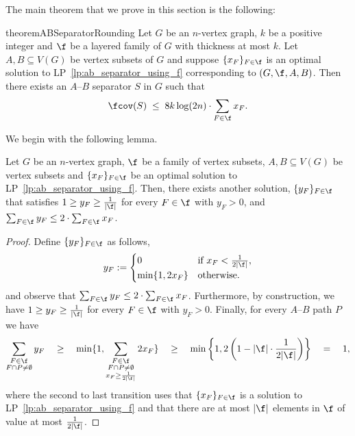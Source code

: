 The main theorem that we prove in this section is the following:

\begin{restatable}{theorem}{ABSeparatorRounding}\label{thm:ab_separator}
    Let $G$ be an $n$-vertex graph, $k$ be a positive integer and $\f$ be a layered family of $G$ with thickness at most $k$. Let $A,B \subseteq V(G)$ be vertex subsets of $G$ and suppose $\{x_F\}_{F \in \f}$ is an optimal solution to LP~\ref{lp:ab_separator_using_f} corresponding to $(G,\f,A,B)$. Then there exists an $A$--$B$ separator $S$ in $G$ such that
    $$
    \fcov(S) \;\le\; 8k  \log(2n) \cdot \sum_{F \in \f} x_F.
    $$
\end{restatable}


We begin with the following lemma.

\begin{lemma}\label{lem:x_F_behaves_nicely}
    Let $G$ be an $n$-vertex graph, $\f$ be a family of vertex subsets, $A, B \subseteq V(G)$ be vertex subsets and $\{x_F\}_{F\in\f}$ be an optimal solution to LP~\ref{lp:ab_separator_using_f}. Then, there exists another solution, $\{y_F\}_{F \in \f}$ that satisfies $1 \geq y_F \geq \frac{1}{|\f|}$ for every $F \in \f$ with $y_F > 0$, and $\sum_{F \in \f} y_F \leq 2 \cdot \sum_{F \in \f} x_F$.
\end{lemma}
\begin{proof}
    Define $\{y_F\}_{F \in \f}$ as follows,
    $$
    y_F := 
    \begin{cases}
    0 & \text{if } x_F < \frac{1}{2|\f|}, \\
    \min\{1, 2x_F\} & \text{otherwise}.
    \end{cases}
    $$
    and observe that $\sum_{F \in \f} y_F \leq 2 \cdot \sum_{F \in \f} x_F$. Furthermore, by construction, we have $1 \geq y_F \geq \frac{1}{|\f|}$ for every $F \in \f$ with $y_F > 0$. Finally, for every $A$--$B$ path $P$ we have
    $$
    \sum_{\substack{F \in \f\\ F \cap P \neq \emptyset}} y_F \quad
    \geq \quad \min\{1, \sum_{\substack{ F \in \f \\ F \cap P \neq \emptyset \\ x_F \geq \frac{1}{2|\f|}}} 2x_F \} \quad
    \geq \quad \min\left\{1, 2\left(1 - |\f| \cdot \frac{1}{2|\f|}\right)\right\}\quad
    = \quad  1,
    $$
    where the second to last transition uses that $\{x_F\}_{F\in\f}$ is a solution to LP~\ref{lp:ab_separator_using_f} and that there are at most $|\f|$ elements in $\f$ of value at most $\frac{1}{2|\f|}$.
\end{proof}


